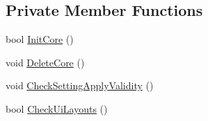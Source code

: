 \subsection*{Private Member Functions}
\begin{DoxyCompactItemize}
\item 
bool \hyperlink{classCWindowMain_a7a64b7f7d3cb7b2094f4a2a347e357ce}{InitCore} ()
\item 
void \hyperlink{classCWindowMain_a75d596613f67f6e7b1f363a3cef1c3a3}{DeleteCore} ()
\item 
void \hyperlink{classCWindowMain_af1f48b80b58de4cefaee7ca9fdfaa912}{CheckSettingApplyValidity} ()
\item 
bool \hyperlink{classCWindowMain_a0c10998825e8d84929d0926b6db8ca23}{CheckUiLayouts} ()
\end{DoxyCompactItemize}
